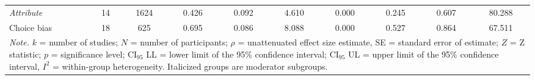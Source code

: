 \begin{table}[ht]
\begin{tabular}{lccccccccc}
  \hspace{2mm}\textit{Attribute} & 14 & 1624 & 0.426 & 0.092 & 4.610 & 0.000 & 0.245 & 0.607 & 80.288 \\ 
  Choice bias & 18 & 625 & 0.695 & 0.086 & 8.088 & 0.000 & 0.527 & 0.864 & 67.511 \\ 
   \hline 
 \multicolumn{10}{p{0.9\textwidth}}{\scriptsize{\textit{Note.} $k$ = number of studies; $N$ = number of participants; $\rho$ = unattenuated effect size estimate, SE = standard error of estimate; $Z$ = Z statistic; $p$ = significance level; $\textrm{CI}_{95}$ LL = lower limit of the 95\% confidence interval; $\textrm{CI}_{95}$ UL = upper limit of the 95\% confidence interval, $I^2$ = within-group heterogeneity. Italicized groups are moderator subgroups.}} 
\end{tabular}
\end{table}
